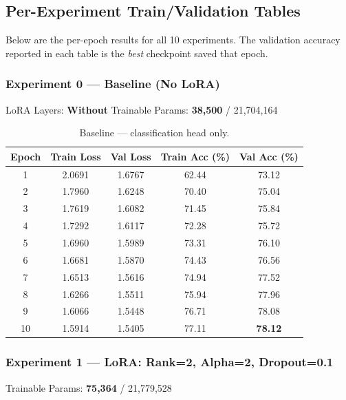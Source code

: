 \documentclass[11pt,a4paper]{article}
\begin{document}
\subsection{Per-Experiment Train/Validation Tables}

Below are the per-epoch results for all 10 experiments. The validation accuracy reported in each table is the \emph{best} checkpoint saved that epoch.

\subsubsection*{Experiment 0 — Baseline (No LoRA)}
\begin{center}
\small
LoRA Layers: \textbf{Without} \quad Trainable Params: \textbf{38,500} / 21,704,164
\end{center}

\begin{table}[H]
\centering
\begin{tabular}{@{}ccccc@{}}
\toprule
\textbf{Epoch} & \textbf{Train Loss} & \textbf{Val Loss} & \textbf{Train Acc (\%)} & \textbf{Val Acc (\%)} \\
\midrule
1  & 2.0691 & 1.6767 & 62.44 & 73.12 \\
2  & 1.7960 & 1.6248 & 70.40 & 75.04 \\
3  & 1.7619 & 1.6082 & 71.45 & 75.84 \\
4  & 1.7292 & 1.6117 & 72.28 & 75.72 \\
5  & 1.6960 & 1.5989 & 73.31 & 76.10 \\
6  & 1.6681 & 1.5870 & 74.43 & 76.56 \\
7  & 1.6513 & 1.5616 & 74.94 & 77.52 \\
8  & 1.6266 & 1.5511 & 75.94 & 77.96 \\
9  & 1.6066 & 1.5448 & 76.71 & 78.08 \\
10 & 1.5914 & 1.5405 & 77.11 & \textbf{78.12} \\
\bottomrule
\end{tabular}
\caption{Baseline — classification head only.}
\end{table}

\subsubsection*{Experiment 1 — LoRA: Rank=2, Alpha=2, Dropout=0.1}
\begin{center}
\small Trainable Params: \textbf{75,364} / 21,779,528
\end{center}
\end{document}
